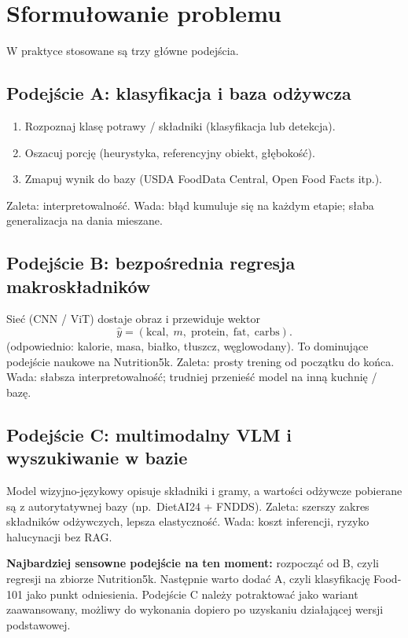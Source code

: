 \documentclass[11pt,a4paper]{article}
\begin{document}
\section{Sformułowanie problemu}

W praktyce stosowane są trzy główne podejścia.

\subsection{Podejście A: klasyfikacja i baza odżywcza}
\begin{enumerate}[leftmargin=*]
  \item Rozpoznaj klasę potrawy / składniki (klasyfikacja lub detekcja).
  \item Oszacuj porcję (heurystyka, referencyjny obiekt, głębokość).
  \item Zmapuj wynik do bazy (USDA FoodData Central, Open Food Facts itp.).
\end{enumerate}
Zaleta: interpretowalność. Wada: błąd kumuluje się na każdym etapie;
słaba generalizacja na dania mieszane.

\subsection{Podejście B: bezpośrednia regresja makroskładników}
Sieć (CNN / ViT) dostaje obraz i przewiduje wektor
\[
  \hat{y} = (\mathrm{kcal},\; m,\; \mathrm{protein},\; \mathrm{fat},\; \mathrm{carbs}).
\]
(odpowiednio: kalorie, masa, białko, tłuszcz, węglowodany).
To dominujące podejście naukowe na Nutrition5k.
Zaleta: prosty trening od początku do końca. Wada: słabsza interpretowalność;
trudniej przenieść model na inną kuchnię / bazę.

\subsection{Podejście C: multimodalny VLM i wyszukiwanie w bazie}
Model wizyjno-językowy opisuje składniki i gramy, a wartości odżywcze
pobierane są z autorytatywnej bazy (np.\ DietAI24 + FNDDS).
Zaleta: szerszy zakres składników odżywczych, lepsza elastyczność.
Wada: koszt inferencji, ryzyko halucynacji bez RAG.

\textbf{Najbardziej sensowne podejście na ten moment:} rozpocząć od B,
czyli regresji na zbiorze Nutrition5k. Następnie warto dodać A, czyli
klasyfikację Food-101 jako punkt odniesienia. Podejście C należy potraktować
jako wariant zaawansowany, możliwy do wykonania dopiero po uzyskaniu
działającej wersji podstawowej.
\end{document}
